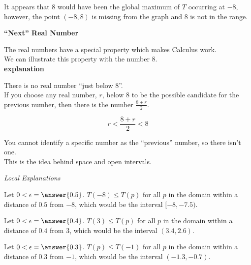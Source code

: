 \documentclass{ximera}
\begin{document}
It appears that $8$ would have been the global maximum of $T$ occurring at $-8$, however, the point $(-8, 8)$ is missing from the graph and $8$ is not in the range.  



\begin{idea}  \textbf{\textcolor{blue!55!black}{``Next'' Real Number}}


The real numbers have a special property which makes Calculus work. \\

We can illustrate this property with the number $8$. \\

\textbf{explanation}




There is no real number ``just below $8$''.  \\


If you choose any real number, $r$, below $8$ to be the possible candidate for the previous number, then there is the number $\frac{8+r}{2}$. 

\[  
r < \frac{8+r}{2} < 8
\]  

You cannot identify a specific number as the ``previous'' number, so there isn't one. \\

This is the idea behind space and open intervals.




\end{idea}



\begin{explanation} \textit{Local Explanations}


Let $0 < \epsilon = \answer{0.5}$.  $T(-8) \leq T(p)$ for all $p$ in the domain within a distance of $0.5$ from $-8$, which would be the interval $[-8, -7.5)$.

Let $0 < \epsilon = \answer{0.4}$.  $T(3) \leq T(p)$ for all $p$ in the domain within a distance of $0.4$ from $3$, which would be the interval $(3.4, 2.6)$.

Let $0 < \epsilon = \answer{0.3}$.  $T(p) \leq T(-1)$ for all $p$ in the domain within a distance of $0.3$ from $-1$, which would be the interval $(-1.3, -0.7)$.

\end{explanation}
\end{document}
